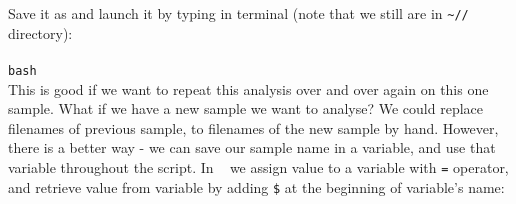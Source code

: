 
%
Save it as \texttt{\pipename} and launch it by typing in terminal (note that we still are in
\texttt{\textasciitilde/\workDir/\reseqDir} directory):\\~\\
\texttt{bash \pipename}\\

This is good if we want to repeat this analysis over and over again on this one sample.
What if we have a new sample we want to analyse? We could replace filenames of previous sample,
to filenames of the new sample by hand. However, there is a better way - we can save our
sample name in a variable, and use that variable throughout the script. In \bash~
we assign value to a variable with \texttt{=} operator, and retrieve value from variable
by adding \texttt{\$} at the beginning of variable's name:

